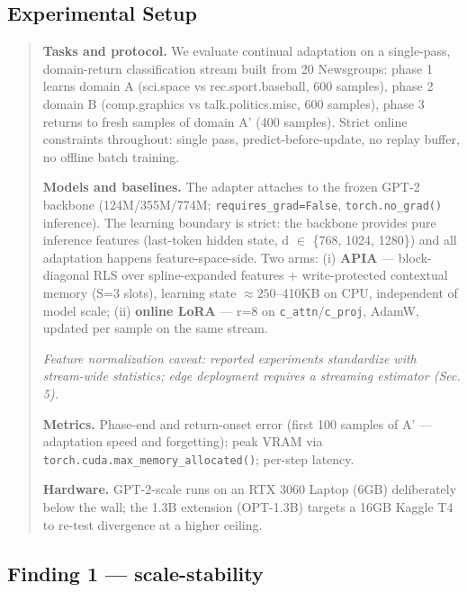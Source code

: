\documentclass[11pt]{article}
\begin{document}
\subsection{Experimental Setup}\label{experimental-setup}

\begin{quote}
\textbf{Tasks and protocol.} We evaluate continual adaptation on a single-pass, domain-return classification stream built from 20 Newsgroups: phase 1 learns domain A (sci.space vs rec.sport.baseball, 600 samples), phase 2 domain B (comp.graphics vs talk.politics.misc, 600 samples), phase 3 returns to fresh samples of domain A' (400 samples). Strict online constraints throughout: single pass, predict-before-update, no replay buffer, no offline batch training.

\textbf{Models and baselines.} The adapter attaches to the frozen GPT-2 backbone (124M/355M/774M; \texttt{requires\_grad=False}, \texttt{torch.no\_grad()} inference). The learning boundary is strict: the backbone provides pure inference features (last-token hidden state, d \(\in\) \{768, 1024, 1280\}) and all adaptation happens feature-space-side. Two arms: (i) \textbf{APIA} --- block-diagonal RLS over spline-expanded features + write-protected contextual memory (S=3 slots), learning state \(\approx 250\)--410KB on CPU, independent of model scale; (ii) \textbf{online LoRA} --- r=8 on \texttt{c\_attn}/\texttt{c\_proj}, AdamW, updated per sample on the same stream.

\emph{Feature normalization caveat: reported experiments standardize with stream-wide statistics; edge deployment requires a streaming estimator (Sec. 5).}

\textbf{Metrics.} Phase-end and return-onset error (first 100 samples of A' --- adaptation speed and forgetting); peak VRAM via \texttt{torch.cuda.max\_memory\_allocated()}; per-step latency.

\textbf{Hardware.} GPT-2-scale runs on an RTX 3060 Laptop (6GB) deliberately below the wall; the 1.3B extension (OPT-1.3B) targets a 16GB Kaggle T4 to re-test divergence at a higher ceiling.
\end{quote}

\subsection{Finding 1 --- scale-stability}\label{finding-1-scale-stability}
\end{document}
